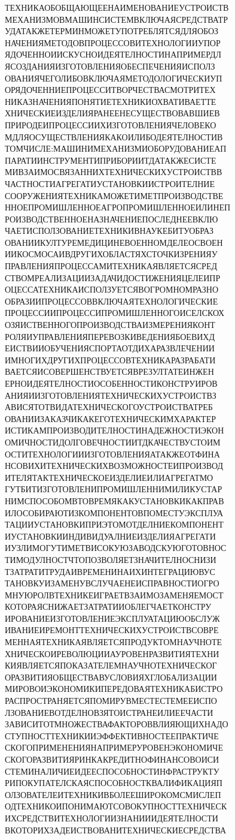 \documentclass[a4paper, 14pt]{extarticle}
\begin{document}
ТЕХНИКАОБОБЩАЮЩЕЕНАИМЕНОВАНИЕУСТРОИСТВ
МЕХАНИЗМОВМАШИНСИСТЕМВКЛЮЧАЯСРЕДСТВАТР
УДАТАКЖЕТЕРМИНМОЖЕТУПОТРЕБЛЯТСЯДЛЯОБОЗ
НАЧЕНИЯМЕТОДОВПРОЦЕССОВИТЕХНОЛОГИИУПОР
ЯДОЧЕННОИИСКУСНОИДЕЯТЕЛНОСТИНАПРИМЕРДЛ
ЯСОЗДАНИЯИЗГОТОВЛЕНИЯОБЕСПЕЧЕНИЯИСПОЛЗ
ОВАНИЯЧЕГОЛИБОВКЛЮЧАЯМЕТОДОЛОГИЧЕСКИУП
ОРЯДОЧЕННИЕПРОЦЕССИТВОРЧЕСТВАСМОТРИТЕХ
НИКАЗНАЧЕНИЯПОНЯТИЕТЕХНИКИОХВАТИВАЕТТЕ
ХНИЧЕСКИЕИЗДЕЛИЯРАНЕЕНЕСУЩЕСТВОВАВШИЕВ
ПРИРОДЕИПРОЦЕССИИХИЗГОТОВЛЕНИЯЧЕЛОВЕКО
МДЛЯОСУЩЕСТВЛЕНИЯКАКОИЛИБОДЕЯТЕЛНОСТИВ
ТОМЧИСЛЕ:МАШИНИМЕХАНИЗМИОБОРУДОВАНИЕАП
ПАРАТИИНСТРУМЕНТИПРИБОРИИТДАТАКЖЕСИСТЕ
МИВЗАИМОСВЯЗАННИХТЕХНИЧЕСКИХУСТРОИСТВВ
ЧАСТНОСТИАГРЕГАТИУСТАНОВКИИСТРОИТЕЛНИЕ
СООРУЖЕНИЯТЕХНИКАМОЖЕТИМЕТПРОИЗВОДСТВЕ
ННОЕПРОМИШЛЕННОЕАГРОПРОМИШЛЕННОЕИЛИНЕП
РОИЗВОДСТВЕННОЕНАЗНАЧЕНИЕПОСЛЕДНЕЕВКЛЮ
ЧАЕТИСПОЛЗОВАНИЕТЕХНИКИВНАУКЕБИТУОБРАЗ
ОВАНИИКУЛТУРЕМЕДИЦИНЕВОЕННОМДЕЛЕОСВОЕН
ИИКОСМОСАИВДРУГИХОБЛАСТЯХСТОЧКИЗРЕНИЯУ
ПРАВЛЕНИЯПРОЦЕССАМИТЕХНИКАЯВЛЯЕТСЯСРЕД
СТВОМРЕАЛИЗАЦИИЗАДАЧИДОСТИЖЕНИЯЦЕЛЕИПР
ОЦЕССАТЕХНИКАИСПОЛЗУЕТСЯВОГРОМНОМРАЗНО
ОБРАЗИИПРОЦЕССОВВКЛЮЧАЯТЕХНОЛОГИЧЕСКИЕ
ПРОЦЕССИИПРОЦЕССИПРОМИШЛЕННОГОИСЕЛСКОХ
ОЗЯИСТВЕННОГОПРОИЗВОДСТВАИЗМЕРЕНИЯКОНТ
РОЛЯИУПРАВЛЕНИЯПЕРЕВОЗКИВЕДЕНИЯБОЕВИХД
ЕИСТВИИОБУЧЕНИЯСПОРТАОТДИХАРАЗВЛЕЧЕНИИ
ИМНОГИХДРУГИХПРОЦЕССОВТЕХНИКАРАЗРАБАТИ
ВАЕТСЯИСОВЕРШЕНСТВУЕТСЯВРЕЗУЛТАТЕИНЖЕН
ЕРНОИДЕЯТЕЛНОСТИОСОБЕННОСТИКОНСТРУИРОВ
АНИЯИИЗГОТОВЛЕНИЯТЕХНИЧЕСКИХУСТРОИСТВЗ
АВИСЯТОТВИДАТЕХНИЧЕСКОГОУСТРОИСТВАТРЕБ
ОВАНИИЗАКАЗЧИКАКЕГОТЕХНИЧЕСКИМХАРАКТЕР
ИСТИКАМПРОИЗВОДИТЕЛНОСТИНАДЕЖНОСТИЭКОН
ОМИЧНОСТИДОЛГОВЕЧНОСТИИТДКАЧЕСТВУСТОИМ
ОСТИТЕХНОЛОГИИИЗГОТОВЛЕНИЯАТАКЖЕОТФИНА
НСОВИХИТЕХНИЧЕСКИХВОЗМОЖНОСТЕИПРОИЗВОД
ИТЕЛЯТАКТЕХНИЧЕСКОЕИЗДЕЛИЕИЛИАГРЕГАТМО
ГУТБИТИЗГОТОВЛЕНИПРОМИШЛЕННИМИЛИКУСТАР
НИМСПОСОБОМВТОВРЕМЯКАКУСТАНОВКИКАКПРАВ
ИЛОСОБИРАЮТИЗКОМПОНЕНТОВПОМЕСТУЭКСПЛУА
ТАЦИИУСТАНОВКИПРИЭТОМОТДЕЛНИЕКОМПОНЕНТ
ИУСТАНОВКИИНДИВИДУАЛНИЕИЗДЕЛИЯАГРЕГАТИ
ИУЗЛИМОГУТИМЕТВИСОКУЮЗАВОДСКУЮГОТОВНОС
ТИМОДУЛНОСТЧТОПОЗВОЛЯЕТЗНАЧИТЕЛНОСНИЗИ
ТЗАТРАТИТРУДАИВРЕМЕНИНАИХИНТЕГРАЦИЮВУС
ТАНОВКУИЗАМЕНУВСЛУЧАЕНЕИСПРАВНОСТИОГРО
МНУЮРОЛВТЕХНИКЕИГРАЕТВЗАИМОЗАМЕНЯЕМОСТ
КОТОРАЯСНИЖАЕТЗАТРАТИИОБЛЕГЧАЕТКОНСТРУ
ИРОВАНИЕИЗГОТОВЛЕНИЕЭКСПЛУАТАЦИЮОБСЛУЖ
ИВАНИЕИРЕМОНТТЕХНИЧЕСКИХУСТРОИСТВСОВРЕ
МЕННАЯТЕХНИКАЯВЛЯЕТСЯПРОДУКТОМНАУЧНОТЕ
ХНИЧЕСКОИРЕВОЛЮЦИИАУРОВЕНРАЗВИТИЯТЕХНИ
КИЯВЛЯЕТСЯПОКАЗАТЕЛЕМНАУЧНОТЕХНИЧЕСКОГ
ОРАЗВИТИЯОБЩЕСТВАВУСЛОВИЯХГЛОБАЛИЗАЦИИ
МИРОВОИЭКОНОМИКИПЕРЕДОВАЯТЕХНИКАБИСТРО
РАСПРОСТРАНЯЕТСЯПОМИРУВМЕСТЕСТЕМЕЕИСПО
ЛЗОВАНИЕВОТДЕЛНОВЗЯТОИСТРАНЕИЛИЕЕЧАСТИ
ЗАВИСИТОТМНОЖЕСТВАФАКТОРОВВЛИЯЮЩИХНАДО
СТУПНОСТТЕХНИКИИЭФФЕКТИВНОСТЕЕПРАКТИЧЕ
СКОГОПРИМЕНЕНИЯНАПРИМЕРУРОВЕНЭКОНОМИЧЕ
СКОГОРАЗВИТИЯРИНКАКРЕДИТНОФИНАНСОВОИСИ
СТЕМИНАЛИЧИЕИДЕЕСПОСОБНОСТИНФРАСТРУКТУ
РИПОКУПАТЕЛСКАЯСПОСОБНОСТКВАЛИФИКАЦИЯП
ОЛЗОВАТЕЛЕИТЕХНИКИВБОЛЕЕШИРОКОМСМИСЛЕП
ОДТЕХНИКОИПОНИМАЮТСОВОКУПНОСТТЕХНИЧЕСК
ИХСРЕДСТВИТЕХНОЛОГИИЗНАНИИИДЕЯТЕЛНОСТИ
ВКОТОРИХЗАДЕИСТВОВАНИТЕХНИЧЕСКИЕСРЕДСТВА
\end{document}
